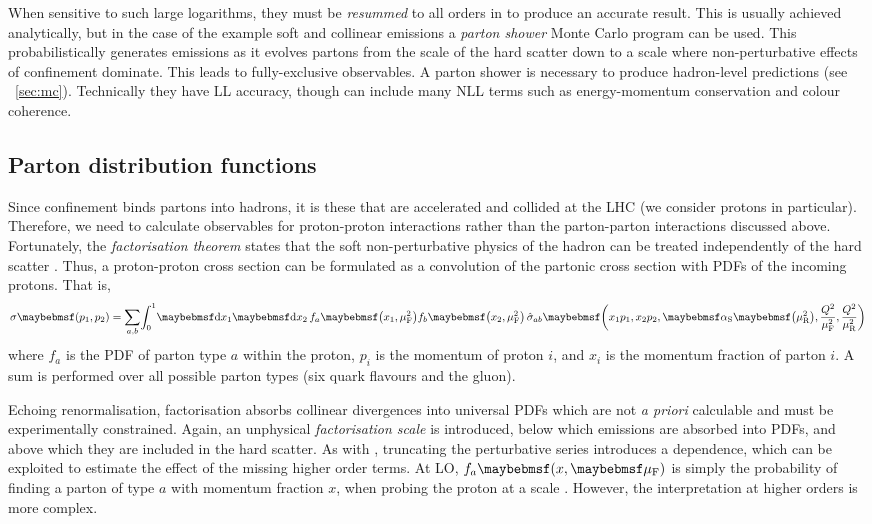 When sensitive to such large logarithms, they must be \textit{resummed} to all orders in 
\alphaS to produce an accurate result. This is usually achieved analytically, but in the 
case of the example soft and collinear emissions a \textit{parton shower} Monte Carlo 
program can be used. This probabilistically generates emissions as it evolves partons 
from the scale of the hard scatter down to a scale where non-perturbative effects of 
confinement dominate. This leads to fully-exclusive observables. A parton shower is 
necessary to produce hadron-level predictions (see \Section~\ref{sec:mc}). Technically 
they have \ac{LL} accuracy, though can include many \ac{NLL} terms such as 
energy-momentum conservation and colour coherence.



\subsection{Parton distribution functions}
\label{sec:qcd:pdf}

Since confinement binds partons into hadrons, it is these that are accelerated and 
collided at the \acs{LHC} (we consider protons in particular). Therefore, we need to 
calculate observables for proton-proton interactions rather than the parton-parton 
interactions discussed above. Fortunately, the \textit{factorisation theorem} states that 
the soft non-perturbative physics of the hadron can be treated independently of the hard 
scatter \cite{Collins:1982}. Thus, a proton-proton cross section can be formulated as a 
convolution of the partonic cross section with \acp{PDF} of the incoming protons. That is,
\begin{equation}
	\sigma\parenths{p_1, p_2} = 
	\sum\limits_{a, b} \! \int_0^1 \! \d{x_1} \d{x_2} \,
	f_a \parenths{x_1, \mu_{\text{F}}^2} f_b \parenths{x_2, \mu_{\text{F}}^2} \,
	\hat{\sigma}_{ab} \parenths{x_1 p_1, x_2 p_2, \alphaS\parenths{\mu_{\text{R}}^2}, 
	\frac{Q^2}{\mu_{\text{F}}^2}, \frac{Q^2}{\mu_{\text{R}}^2}} 
\end{equation}
where $f_a$ is the \ac{PDF} of parton type $a$ within the proton, $p_i$ is the momentum 
of proton $i$, and $x_i$ is the momentum fraction of parton $i$. A sum is performed over 
all possible parton types (six quark flavours and the gluon).

Echoing renormalisation, factorisation absorbs collinear divergences into universal 
\acp{PDF} which are not \textit{a priori} calculable and must be experimentally 
constrained. Again, an unphysical \textit{factorisation scale} \muf is introduced, 
below which emissions are absorbed into \acp{PDF}, and above which they are included in 
the hard scatter. As with \mur, truncating the perturbative series introduces a 
\muf dependence, which can be exploited to estimate the effect of the missing higher 
order terms. At \ac{LO}, $f_a \parenths{x, \muf}$ is simply the probability of finding a 
parton of type $a$ with momentum fraction $x$, when probing the proton at a scale \muf.
However, the interpretation at higher orders is more complex.


